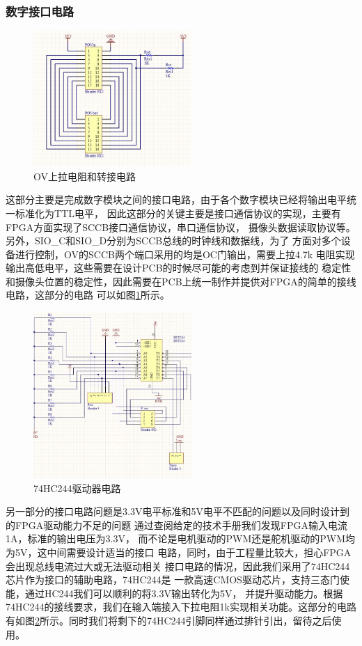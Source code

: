 \documentclass[a4paper]{paper}
\begin{document}
\subsubsection{数字接口电路}
\begin{figure}
    \centering
    \includegraphics[width = 60mm]{ov47.jpg}
    \caption{OV上拉电阻和转接电路}
    \label{OV}
\end{figure}
这部分主要是完成数字模块之间的接口电路，由于各个数字模块已经将输出电平统一标准化为TTL电平，
因此这部分的关键主要是接口通信协议的实现，主要有FPGA方面实现了SCCB接口通信协议，串口通信协议，
摄像头数据读取协议等。另外，SIO\_C和SIO\_D分别为SCCB总线的时钟线和数据线，为了
方面对多个设备进行控制，OV的SCCB两个端口采用的均是OC门输出，需要上拉4.7k
电阻实现输出高低电平，这些需要在设计PCB的时候尽可能的考虑到并保证接线的
稳定性和摄像头位置的稳定性，因此需要在PCB上统一制作并提供对FPGA的简单的接线电路，这部分的电路
可以如图\ref{OV}所示。

\begin{figure}
    \centering
    \includegraphics[width =60mm]{motor0.jpg}
    \caption{74HC244驱动器电路}
    \label{motor0}
\end{figure}
另一部分的接口电路问题是3.3V电平标准和5V电平不匹配的问题以及同时设计到的FPGA驱动能力不足的问题
通过查阅给定的技术手册我们发现FPGA输入电流1A，标准的输出电压为3.3V，
而不论是电机驱动的PWM还是舵机驱动的PWM均为5V，这中间需要设计适当的接口
电路，同时，由于工程量比较大，担心FPGA会出现总线电流过大或无法驱动相关
接口电路的情况，因此我们采用了74HC244芯片作为接口的辅助电路，74HC244是
一款高速CMOS驱动芯片，支持三态门使能，通过HC244我们可以顺利的将3.3V输出转化为5V，
并提升驱动能力。根据74HC244的接线要求，我们在输入端接入下拉电阻1k实现相关功能。这部分的电路
有如图\ref{motor0}所示。同时我们将剩下的74HC244引脚同样通过排针引出，留待之后使用。
\end{document}
